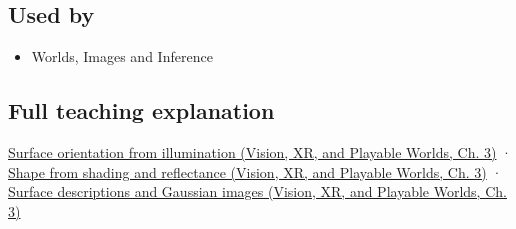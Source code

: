 \subsection{Used by}\label{appendix-89b2d5b7c9e1-used-by}

\begin{itemize}
\tightlist
\item
  {Worlds, Images and Inference}
\end{itemize}

\subsection{Full teaching explanation}\label{appendix-89b2d5b7c9e1-full-teaching-explanation}

\href{../07-Vision-XR-and-Playable-Worlds/main.pdf\#nameddest=04-visual-computing-ii-ch032-surface-orientation-from-illumination}{Surface orientation from illumination (Vision, XR, and Playable Worlds, Ch. 3)} · \href{../07-Vision-XR-and-Playable-Worlds/main.pdf\#nameddest=04-visual-computing-ii-ch032-shape-from-shading-and-reflectance}{Shape from shading and reflectance (Vision, XR, and Playable Worlds, Ch. 3)} · \href{../07-Vision-XR-and-Playable-Worlds/main.pdf\#nameddest=04-visual-computing-ii-ch032-surface-descriptions-and-gaussian-images}{Surface descriptions and Gaussian images (Vision, XR, and Playable Worlds, Ch. 3)}
